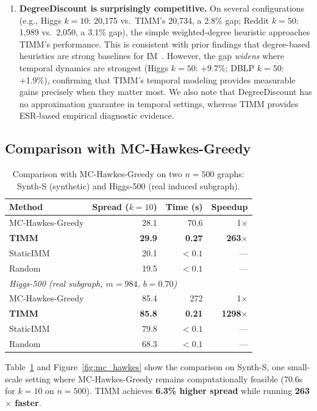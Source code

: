 \documentclass[10pt,conference]{IEEEtran}
\begin{document}
\begin{enumerate}
\item \textbf{DegreeDiscount is surprisingly competitive.}
On several configurations (e.g., Higgs $k{=}10$: 20,175 vs.\ TIMM's 20,734, a 2.8\% gap; Reddit $k{=}50$: 1,989 vs.\ 2,050, a 3.1\% gap), the simple weighted-degree heuristic approaches TIMM's performance.
This is consistent with prior findings that degree-based heuristics are strong baselines for IM~\cite{chen2009}.
However, the gap \emph{widens} where temporal dynamics are strongest (Higgs $k{=}50$: +9.7\%; DBLP $k{=}50$: +1.9\%), confirming that TIMM's temporal modeling provides measurable gains precisely when they matter most.
We also note that DegreeDiscount has no approximation guarantee in temporal settings, whereas TIMM provides ESR-based empirical diagnostic evidence.
\end{enumerate}

\subsection{Comparison with MC-Hawkes-Greedy}

\begin{table}[t]
\centering
\caption{Comparison with MC-Hawkes-Greedy on two $n{=}500$ graphs: Synth-S (synthetic) and Higgs-500 (real induced subgraph).}
\label{tab:mc_hawkes}
\footnotesize
\setlength{\tabcolsep}{6pt}
\begin{tabular}{@{}lrrr@{}}
\toprule
Method & Spread ($k=10$) & Time (s) & Speedup \\
\midrule
MC-Hawkes-Greedy & 28.1 & 70.6 & 1$\times$ \\
\textbf{TIMM} & \textbf{29.9} & \textbf{0.27} & \textbf{263$\times$} \\
StaticIMM & 20.1 & ${<}0.1$ & --- \\
Random & 19.5 & ${<}0.1$ & --- \\
\midrule
\multicolumn{4}{l}{\textit{Higgs-500 (real subgraph, $m{=}984$, $b{=}0.70$)}} \\
MC-Hawkes-Greedy & 85.4 & 272 & 1$\times$ \\
\textbf{TIMM} & \textbf{85.8} & \textbf{0.21} & \textbf{1298$\times$} \\
StaticIMM & 79.8 & ${<}0.1$ & --- \\
Random & 68.3 & ${<}0.1$ & --- \\
\bottomrule
\end{tabular}
\end{table}

Table~\ref{tab:mc_hawkes} and Figure~\ref{fig:mc_hawkes} show the comparison on Synth-S, one small-scale setting where MC-Hawkes-Greedy remains computationally feasible (70.6s for $k=10$ on $n=500$).
TIMM achieves \textbf{6.3\% higher spread} while running \textbf{263$\times$ faster}.
\end{document}
